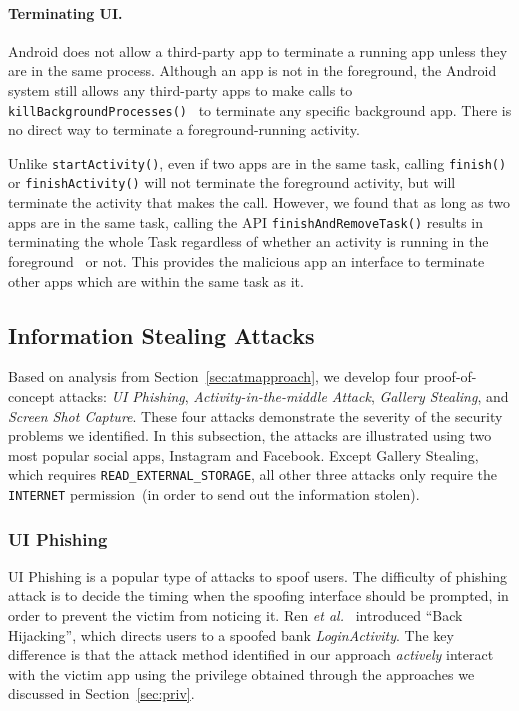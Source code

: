 \documentclass[letterpaper,12pt]{article}
\begin{document}
\paragraph*{Terminating UI.}
Android does not allow a third-party app to terminate a running app
unless they are in the same process. Although an app is not in the
foreground, the Android system still allows any third-party apps to
make calls to\\
\texttt{killBackgroundProcesses()}~\cite{killBackgroundProcesses} to
terminate any specific background app. There is no direct way to
terminate a foreground-running activity.

Unlike \texttt{startActivity()}, even if two apps are in the same
task, calling \texttt{finish()} or \texttt{finishActivity()} will not
terminate the foreground activity, but will terminate the activity
that makes the call. However, we found that as long as two apps are in
the same task, calling the API \texttt{finishAndRemoveTask()} results
in terminating the whole Task regardless of whether an activity is
running in the foreground~\cite{finishAndRemoveTask} or not.
This provides the malicious app an interface to terminate other apps which are within the same task as it.

\subsection{Information Stealing Attacks}\label{sec:infoattack}
Based on analysis from Section~\ref{sec:atmapproach}, we develop
four proof-of-concept attacks: \textsl{UI Phishing},
\textsl{Activity-in-the-middle Attack}, \textsl{Gallery Stealing}, and
\textsl{Screen Shot Capture}. These four attacks demonstrate the
severity of the security problems we identified. In this subsection, the
attacks are illustrated using two most popular social apps, Instagram
and Facebook. Except Gallery Stealing, which requires
\texttt{READ\_EXTERNAL\_STORAGE}, all other three attacks only require
the \texttt{INTERNET} permission~(in order to send out the information
stolen).

\subsubsection{UI Phishing}
UI Phishing is a popular type of attacks to spoof users.  The
difficulty of phishing attack is to decide the timing when the
spoofing interface should be prompted, in order to prevent the victim
from noticing it.  Ren {\em et al.}~\cite{TaskHijacking} introduced
``Back Hijacking'', which directs users to a spoofed bank
\textit{LoginActivity}. The key difference is that the attack method
identified in our approach {\em actively} interact with the victim app
using the privilege obtained through the approaches we discussed in
Section~\ref{sec:priv}.
\end{document}
